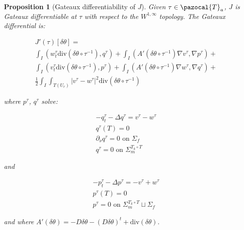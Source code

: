 \documentclass[english,a4paper,10pt,oneside]{scrbook}	%
\theoremstyle{break}
\newtheorem{prop}[equation]{Proposition}
\theoremstyle{remark}
\newcommand{\cT}{\pazocal{T}}
\newcommand{\te}{\theta}
\newcommand{\dive}{\text{div}}
\begin{document}
\begin{prop}[Gateaux differentiability of $J$]
\label{prop:gateaux_diff}
Given $\tau \in \cT_a$, $J$ is Gateaux differentiable at $\tau$ with respect to the $W^{1,\infty}$ topology. The Gateaux differential is:


\begin{align*}
J'(\tau)[\delta \te] =\\ \int_I (w_t^\tau \dive(\delta \te\circ  \tau^{-1}), q^\tau )+ \int_I (A'(\delta\te \circ \tau^{-1})\nabla v^\tau, \nabla p^\tau)+\\
\int_I (v_t^\tau \dive(\delta \te\circ  \tau^{-1}), p^\tau )+ \int_I (A'(\delta\te \circ \tau^{-1})\nabla w^\tau, \nabla q^\tau)+\\
\frac{1}{2}\int_I\int_{T(U_r)}|v^\tau-w^\tau|^2\dive(\delta \te\circ  \tau^{-1})
\end{align*}

where $p^\tau$, $q^\tau$ solve:

\begin{align*}
-q^\tau_t-\Delta q^\tau =v^\tau-w^\tau\\
q^\tau(T)=0\\
\partial_\nu q^\tau = 0 \text{ on } \Sigma_f\\
q^\tau = 0 \text{ on } \Sigma_m^{T_k\circ T}
\end{align*}

and

\begin{align*}
-p^\tau_t-\Delta p^\tau = - v^\tau+ w^\tau \\
p^\tau(T)=0\\
p^\tau = 0 \text{ on } \Sigma_m^{T_k\circ T} \sqcup \Sigma_f
\end{align*}

and where $A'(\delta\te )= - D\delta \te -(D\delta\te)^t + \dive(\delta\te)$.

\end{prop}
\end{document}
